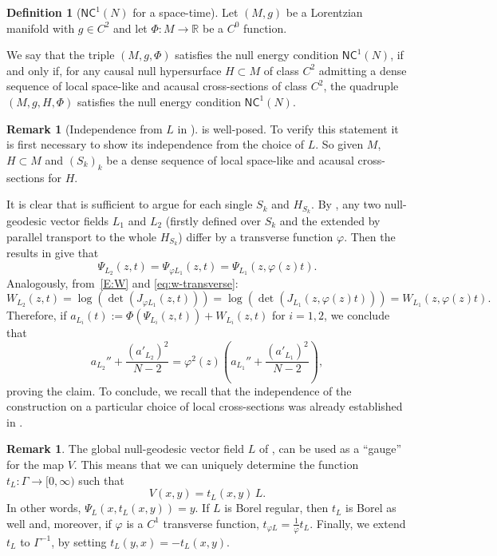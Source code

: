\documentclass[12pt,a4paper]{amsart}
\theoremstyle{plain}
\theoremstyle{definition}
\newtheorem{definition}[lemma]{Definition}
\newtheorem{remark}[lemma]{Remark}
\numberwithin{equation}{section}
\let\phi\varphi
\newcommand{\R}{\mathbb{R}}
\newcommand{\NC}{\mathsf{NC}}
\newcommand{\gflow}{\Psi}
\begin{document}
\begin{definition}[$\NC^{1}(N)$ for a space-time]\label{def:NC1Quadruplesspace}
  Let $(M,g)$ be a Lorentzian manifold with $g\in C^2$ and let $\Phi:M\to\R$
  be a $C^0$ function.
  
  We say that the triple $(M,g,\Phi)$ satisfies the
   null energy condition $\NC^1(N)$, if and only if, for
  any causal null hypersurface $H\subset M$ of class $C^2$ admitting a dense sequence of
  local space-like and acausal cross-sections of class $C^2$, 
  the quadruple $(M,g,H,\Phi)$ satisfies the null
  energy condition $\NC^1(N)$.
\end{definition}

\begin{remark}[Independence from $L$ in ] \label{Rem:indepNC1L}
  is well-posed.  
To verify this statement it is first necessary to 
show its independence from the choice of $L$. 
So given $M$, $H\subset M$ and
$(S_k)_k$ be a dense sequence of local space-like 
and acausal cross-sections for $H$.

It is clear that is sufficient to 
argue for each single $S_k$ and $H_{S_k}$. 
By , any two null-geodesic 
vector fields $L_1$ and $L_2$ (firstly defined  over $S_k$ and the extended by parallel transport to the whole $H_{S_k}$) differ by a transverse function $\varphi$.  
Then the results in  give that
$$
\gflow_{L_2}(z,t) =
\gflow_{\phi L_1}(z,t)
    =
    \gflow_{L_1}(z,\phi(z)t).
$$   
Analogously, from~\eqref{E:W} and
\eqref{eq:w-transverse}: 
%
$$
W_{L_2}(z,t) = \log(\det (J_{\varphi L_1} (z,t)))
= 
\log(\det (J_{L_1} (z,\varphi(z)t))) 
=
W_{L_1}(z, \varphi(z)t). 
$$
%
Therefore, 
if
%
$
a_{L_i}(t):=\Phi(\gflow_{L_i}(z,t)) + W_{L_i}(z,t)
$
%
for $i = 1,2$, we conclude that 
%
$$
a_{L_2}'' + \frac{(a'_{L_2})^2}{N-2} = 
\varphi^2(z) \left( a_{L_1}'' + \frac{(a'_{L_1})^2}{N-2}
\right),
$$
%
proving the claim. 
To conclude, we recall that the independence of the construction on a particular choice of local cross-sections was already established in .
\end{remark}






\begin{remark}
The global null-geodesic vector field $L$ of , can be used as a ``gauge'' for the map $V$.
%
This means that we can uniquely determine the function $t_L:\Gamma\to[0,\infty)$ such that
%
\begin{equation}\label{E:definitiontL}
V(x,y) = t_L(x,y)\,L.
\end{equation}
%
In other words, $\gflow_L(x,t_L(x,y))=y$.
%
If $L$ is Borel regular, then $t_L$ is Borel as well and,
moreover, if $\varphi$ is a  $C^1$ transverse
  function, $t_{\varphi L}=\frac{1}{\varphi} t_L$.
%
Finally, we extend $t_L$ to $\Gamma^{-1}$, by
setting $t_L(y,x)=-t_L(x,y)$.
\end{remark}
\end{document}
